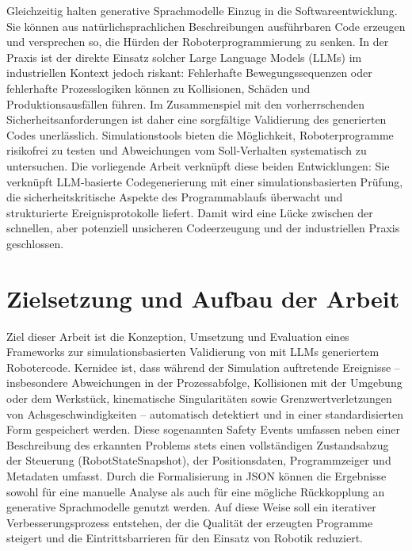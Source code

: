 Gleichzeitig halten generative Sprachmodelle Einzug in die
Softwareentwicklung. Sie können aus natürlichsprachlichen
Beschreibungen ausführbaren Code erzeugen und versprechen so, die
Hürden der Roboterprogrammierung zu senken. In der Praxis ist der
direkte Einsatz solcher Large Language Models (LLMs) im
industriellen Kontext jedoch riskant: Fehlerhafte Bewegungssequenzen
oder fehlerhafte Prozesslogiken können zu Kollisionen, Schäden und
Produktionsausfällen führen. Im Zusammenspiel mit den vorherrschenden
Sicherheitsanforderungen ist daher eine sorgfältige Validierung des
generierten Codes unerlässlich. Simulationstools bieten die
Möglichkeit, Roboterprogramme risikofrei zu testen und Abweichungen
vom Soll‑Verhalten systematisch zu untersuchen. Die vorliegende
Arbeit verknüpft diese beiden Entwicklungen: Sie verknüpft
LLM‑basierte Codegenerierung mit einer simulationsbasierten Prüfung,
die sicherheitskritische Aspekte des Programmablaufs überwacht und
strukturierte Ereignisprotokolle liefert. Damit wird eine Lücke
zwischen der schnellen, aber potenziell unsicheren Codeerzeugung und
der industriellen Praxis geschlossen.

\section{Zielsetzung und Aufbau der Arbeit}
\label{sec:Zielsetzung}

Ziel dieser Arbeit ist die Konzeption, Umsetzung und Evaluation eines
Frameworks zur simulationsbasierten Validierung von mit LLMs
generiertem Robotercode. Kernidee ist, dass während der Simulation
auftretende Ereignisse – insbesondere Abweichungen in der
Prozessabfolge, Kollisionen mit der Umgebung oder dem Werkstück,
kinematische Singularitäten sowie Grenzwertverletzungen von
Achsgeschwindigkeiten – automatisch detektiert und in einer
standardisierten Form gespeichert werden. Diese sogenannten Safety
Events umfassen neben einer Beschreibung des erkannten Problems stets
einen vollständigen Zustandsabzug der Steuerung (RobotStateSnapshot),
der Positionsdaten, Programmzeiger und Metadaten umfasst. Durch die
Formalisierung in JSON können die Ergebnisse sowohl für eine manuelle
Analyse als auch für eine mögliche Rückkopplung an generative
Sprachmodelle genutzt werden. Auf diese Weise soll ein iterativer
Verbesserungsprozess entstehen, der die Qualität der erzeugten
Programme steigert und die Eintrittsbarrieren für den Einsatz von
Robotik reduziert.


